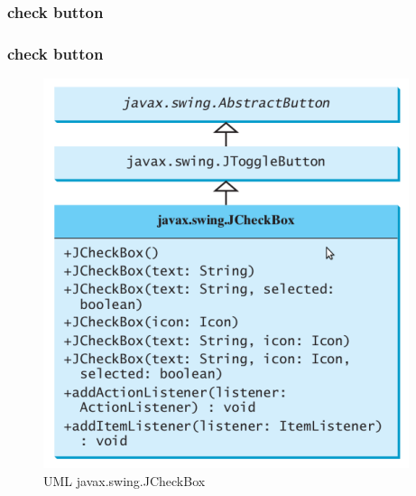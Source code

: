 \documentclass{beamer}
\begin{document}
\subsubsection{check button}
\begin{frame}
\frametitle{check button}
\begin{figure}
\includegraphics[scale=0.6]{imagenes/toogle.png}
\caption{UML javax.swing.JCheckBox}
\end{figure}
\end{frame}

\end{document}
